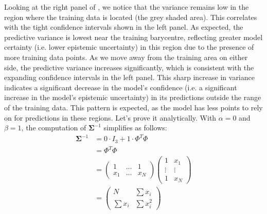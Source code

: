 Looking at the right panel of , we notice that the variance remains low in the region where the training data is located (the grey shaded area). This correlates with the tight confidence intervals shown in the left panel. As expected, the predictive variance is lowest near the training barycentre, reflecting greater model certainty (i.e. lower epistemic uncertainty) in this region due to the presence of more training data points. As we move away from the training area on either side, the predictive variance increases significantly, which is consistent with the expanding confidence intervals in the left panel. This sharp increase in variance indicates a significant decrease in the model's confidence (i.e. a significant increase in the model's epistemic uncertainty) in its predictions outside the range of the training data. This pattern is expected, as the model has less points to rely on for predictions in these regions. %
\vspace{\baselineskip}\linebreak
\noindent Let's prove it analytically. With $\alpha = 0$ and $\beta = 1$, the computation of $\boldsymbol{\Sigma}^{-1}$ simplifies as follows:
\begin{align*}
    \boldsymbol{\Sigma}^{-1} 
        &= 0 \cdot I_3 + 1 \cdot \Phi^T \Phi \\
        &= \Phi^T \Phi \\ 
        &= \begin{pmatrix}
            1 & \dots & 1 \\
            x_1 & \dots & x_N
        \end{pmatrix} 
        \begin{pmatrix}
            1 & x_1 \\
            \vdots & \vdots \\
            1 & x_N 
        \end{pmatrix} \\
        &= \begin{pmatrix}
            N &  \sum x_i \\
             \sum x_i &  \sum x_i^2
        \end{pmatrix}
\end{align*}
